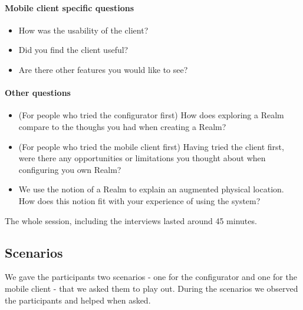 \paragraph{Mobile client specific questions} %
\label{par:mobile_client_specific_questions}
\begin{itemize}
	\item How was the usability of the client?
	\item Did you find the client useful?
	\item Are there other features you would like to see?
\end{itemize}

\paragraph{Other questions} %
\label{par:other_questions}
\begin{itemize}
	\item (For people who tried the configurator first) How does exploring a Realm compare to the thoughs you had when creating a Realm?
	\item (For people who tried the mobile client first) Having tried the client first, were there any opportunities or limitations you thought about when configuring you own Realm?
	\item We use the notion of a Realm to explain an augmented physical location. How does this notion fit with your experience of using the system?
\end{itemize}
\noindent The whole session, including the interviews lasted around 45 minutes.

\subsection{Scenarios} %
\label{sub:scenarios}
We gave the participants two scenarios - one for the configurator and one for the mobile client - that we asked them to play out. During the scenarios we observed the participants and helped when asked.

